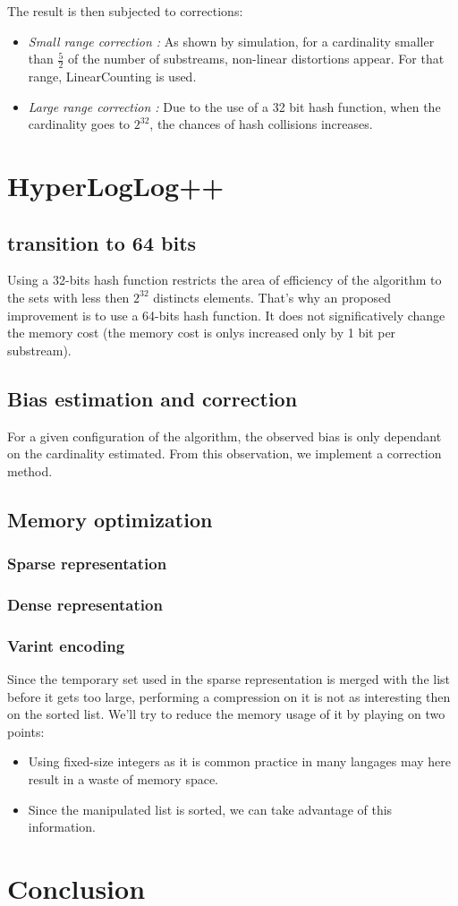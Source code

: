 \documentclass{article}
\begin{document}
The result is then subjected to corrections:
\begin{itemize}
\item \emph{Small range correction :} As shown by simulation, for a
  cardinality smaller than $\frac{5}{2}$ of the number of substreams, non-linear
  distortions appear. For that range, LinearCounting is used.
\item \emph{Large range correction :} Due to the use of a 32 bit hash
  function, when the cardinality goes to $2^{32}$, the chances of hash
  collisions increases.
\end{itemize}

\section{HyperLogLog++}

\subsection{transition to 64 bits}
Using a 32-bits hash function restricts the area of efficiency of the
algorithm to the sets with less then $2^{32}$ distincts elements.
That's why an proposed improvement is to use a 64-bits hash function.
It does not significatively change the memory cost (the memory cost is
 onlys increased only by 1 bit per substream).

\subsection{Bias estimation and correction}
For a given configuration of the algorithm, the observed bias is only
dependant on the cardinality estimated. From this observation, we
implement a correction method.
\subsection{Memory optimization}
\subsubsection{Sparse representation}
\subsubsection{Dense representation}
\subsubsection{Varint encoding}
Since the temporary set used in the sparse representation is merged
with the list before it gets too large, performing a compression on it
is not as interesting then on the sorted list. We'll try to reduce the
memory usage of it by playing on two points:
\begin{itemize}
\item Using fixed-size integers as it is common practice in many
  langages may here result in a waste of memory space.
\item Since the manipulated list is sorted, we can take advantage of
  this information.
\end{itemize}


\section{Conclusion}
\end{document}
